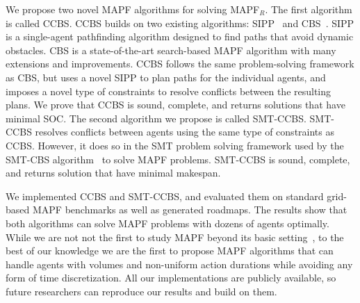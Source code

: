 \documentclass[review]{elsarticle}
\newcommand\konstantin[1]{\nb{\textbf{Konstantin:}}{red}{#1}}
\newcommand\roni[1]{\nb{\textbf{Roni:}}{green}{#1}}
\newcommand{\smt}{\ac{SMT}\xspace}
\newcommand{\ccbs}{\ac{CCBS}\xspace}
\newcommand{\cbs}{\ac{CBS}\xspace}
\newcommand{\sipp}{\ac{SIPP}\xspace}
\newcommand{\mapfr}{\ac{MAPF}$_R$\xspace}
\newcommand{\smtcbsO}{SMT-CBS\xspace} %
\newcommand{\smtccbs}{SMT-CCBS\xspace}
\newcommand{\mapf}{\ac{MAPF}\xspace}
\begin{document}
We propose two novel \mapf algorithms for solving \mapfr. 
The first algorithm is called \ccbs. \ccbs builds on two existing algorithms: 
\sipp~\cite{phillips2011sipp} and \cbs~\cite{sharon2015conflict}. 
\sipp is a  single-agent pathfinding algorithm designed to find paths that avoid dynamic obstacles. %
\cbs is a state-of-the-art search-based \mapf algorithm with many extensions and improvements. 
\ccbs follows the same problem-solving framework as \cbs, but uses a novel \sipp to plan paths for the individual agents, and imposes a novel type of constraints to resolve conflicts between the resulting plans. We prove that \ccbs is sound, complete, and returns solutions that have minimal SOC. 
The second algorithm we propose is called \smtccbs. 
\smtccbs resolves conflicts between agents using the same type of constraints as \ccbs. 
However, it does so in the \smt problem solving framework used by the \smtcbsO algorithm~\cite{DBLP:conf/ijcai/Surynek19} to solve \mapf problems. 
\smtccbs is sound, complete, and returns solution that have minimal makespan. 


We implemented \ccbs and \smtccbs, and evaluated them on standard grid-based \mapf benchmarks as well as generated roadmaps. 
The results show that both algorithms can solve \mapf problems with dozens of agents optimally. 
While we are not not the first to study \mapf beyond its basic setting~\cite[inter alia]{walker2018extended,li2019multi}, to the best of our knowledge we are the first to propose \mapf algorithms that can handle agents with volumes and non-uniform action durations while avoiding any form of time discretization. 
All our implementations are publicly available, so future researchers can reproduce our results and build on them. 
\end{document}
